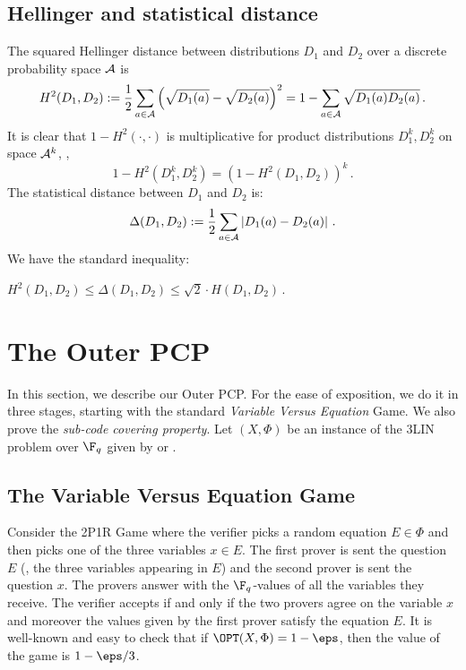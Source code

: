 \subsection{Hellinger and statistical distance}

The squared Hellinger distance between distributions $D_1$ and $D_2$ over a discrete probability space
${\cal A}$ is
\[
H^2(D_1,D_2) := \frac{1}{2} \sum_{a\in {\cal A}}\left(\sqrt{D_1(a)}
  - \sqrt{D_2(a)}\right)^2 = 1 - \sum_{a\in {\cal A}}\sqrt{D_1(a)
  D_2(a)}\,.
\]
It is clear that $1-H^2(\cdot , \cdot)$ is multiplicative for product distributions $D_1^k, D_2^k$ on space
${\cal A}^k$, \ie,
  $$ 1-H^2(D_1^k, D_2^k) =  (1-H^2(D_1,D_2))^k\,.   $$
The statistical distance between $D_1$ and $D_2$ is:
$$\Delta(D_1,D_2) :=  \frac{1}{2} \sum_{a\in {\cal A}}\left|D_1(a) - D_2(a)\right|\,.$$
We have the standard inequality:
\begin{lemma}\label{p:Hellinger} 
$\displaystyle H^2(D_1,D_2) \leq \Delta(D_1,D_2) \leq \sqrt{2} \cdot H(D_1,D_2)\,.$
\end{lemma}









\section{The Outer PCP}\label{sec:outer}
In this section, we describe our Outer PCP\@. For the ease of exposition, we do it in three stages,
starting with the standard \emph{Variable Versus Equation} Game. We also prove the \emph{sub-code covering property}.
Let $(X, \Phi)$ be an instance of the 3LIN problem over $\F_q$ given by 
or .


\subsection{The Variable Versus Equation Game}

Consider the 2P1R Game where the verifier picks a random equation $E \in \Phi$ and then picks one of the three
variables $x \in E$. The first prover is sent the question $E$ (\ie, the three variables appearing in $E$)
and the second prover is sent the question $x$. The provers answer with the $\F_q$-values of all the variables
they receive.
The verifier accepts if and only if the two provers agree on the variable $x$ and moreover
the values given by the first prover
      satisfy the equation $E$. It is well-known and easy to check that
if $\OPT(X,\Phi) = 1-\eps$, then the value of the game is $1- {\eps}/{3}$.

